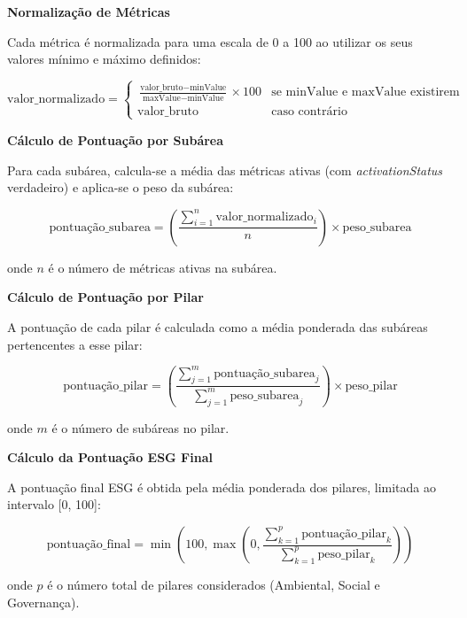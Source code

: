 \textbf{Normalização de Métricas}

Cada métrica é normalizada para uma escala de 0 a 100 ao utilizar os seus valores mínimo e máximo definidos:

\begin{equation}
    \text{valor\_normalizado} = \begin{cases}
        \frac{\text{valor\_bruto} - \text{minValue}}{\text{maxValue} - \text{minValue}} \times 100 & \text{se minValue e maxValue existirem} \\
        \text{valor\_bruto} & \text{caso contrário}
    \end{cases}
\end{equation}

\textbf{Cálculo de Pontuação por Subárea}

Para cada subárea, calcula-se a média das métricas ativas (com \textit{activationStatus} verdadeiro) e aplica-se o peso da subárea:

\begin{equation}
    \text{pontuação\_subarea} = \left( \frac{\sum_{i=1}^{n} \text{valor\_normalizado}_i}{n} \right) \times \text{peso\_subarea}
\end{equation}

onde $n$ é o número de métricas ativas na subárea.

\textbf{Cálculo de Pontuação por Pilar}

A pontuação de cada pilar é calculada como a média ponderada das subáreas pertencentes a esse pilar:

\begin{equation}
    \text{pontuação\_pilar} = \left( \frac{\sum_{j=1}^{m} \text{pontuação\_subarea}_j}{\sum_{j=1}^{m} \text{peso\_subarea}_j} \right) \times \text{peso\_pilar}
\end{equation}

onde $m$ é o número de subáreas no pilar.

\textbf{Cálculo da Pontuação ESG Final}

A pontuação final ESG é obtida pela média ponderada dos pilares, limitada ao intervalo [0, 100]:

\begin{equation}
    \text{pontuação\_final} = \min\left(100, \max\left(0, \frac{\sum_{k=1}^{p} \text{pontuação\_pilar}_k}{\sum_{k=1}^{p} \text{peso\_pilar}_k}\right)\right)
\end{equation}

onde $p$ é o número total de pilares considerados (Ambiental, Social e Governança).

